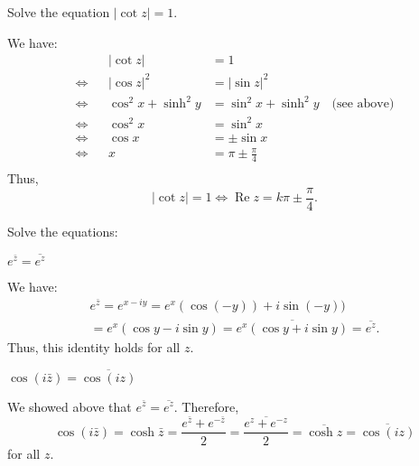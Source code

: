 \documentclass[12pt]{exam}
\renewcommand{\Re}{\operatorname{Re}}
\begin{document}
\begin{questions}
    \question Solve the equation $|\cot z|=1$.
    \begin{solution}
        We have:
        \begin{align*}
            &
            &|\cot z| &= 1\\
            \Longleftrightarrow&
            &|\cos z|^2 &= |\sin z|^2\\
            \Longleftrightarrow&
            &\cos^2 x+\sinh^2 y &= \sin^2 x+ \sinh^2 y\quad\text{(see above)}\\
            \Longleftrightarrow&
            &\cos^2 x &= \sin^2 x\\
            \Longleftrightarrow&
            &\cos x &= \pm \sin x\\
            \Longleftrightarrow&
            & x &= \pi \pm \frac\pi4\\
        \end{align*}
        Thus,
        \[
            |\cot z| = 1\Longleftrightarrow\Re z = k\pi \pm \frac\pi4.
        \]
    \end{solution}



    \question
    Solve the equations:
    \begin{parts}
        \item $e^{\bar{z}}=\overline{e^z}$
        \begin{solution}
            We have:
            \begin{multline*}
                e^{\bar z} = e^{x-iy} = e^x(\cos(-y)) + i\sin(-y))\\ = e^x(\cos y - i\sin y) = 
                \overline{e^x(\cos y + i\sin y)} = \overline{e^z}.
            \end{multline*}
            Thus, this identity holds for all $z$.
        \end{solution}

        \item $\cos(i\bar z) = \overline{\cos(iz)}$
        \begin{solution}
            We showed above that $e^{\bar z} = \overline{e^z}$. Therefore,
            \[
                \cos(i\bar z) = \cosh\bar z = \frac{e^{\bar z} + e^{-\bar z}}2
                = \overline{\frac{e^{z} + e^{- z}}2}
                = \overline{\cosh z}
                = \overline{\cos(iz)}
            \]
            for all $z$.
        \end{solution}
    \end{parts}
\end{questions}
\end{document}

